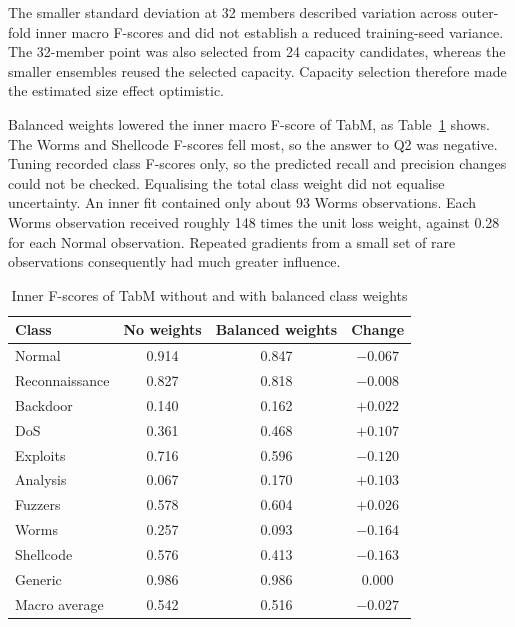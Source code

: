 \documentclass[conference]{IEEEtran}
\begin{document}
The smaller standard deviation at 32 members described variation across outer-fold inner macro F-scores and did not establish a reduced training-seed variance. The 32-member point was also selected from 24 capacity candidates, whereas the smaller ensembles reused the selected capacity. Capacity selection therefore made the estimated size effect optimistic.

Balanced weights lowered the inner macro F-score of TabM, as Table~\ref{tab:classweights} shows. The Worms and Shellcode F-scores fell most, so the answer to Q2 was negative. Tuning recorded class F-scores only, so the predicted recall and precision changes could not be checked. Equalising the total class weight did not equalise uncertainty. An inner fit contained only about 93 Worms observations. Each Worms observation received roughly 148 times the unit loss weight, against 0.28 for each Normal observation. Repeated gradients from a small set of rare observations consequently had much greater influence.

\begin{table}[!t]
    \caption{Inner F-scores of TabM without and with balanced class weights}
    \label{tab:classweights}
    \centering\footnotesize
    \begin{tabular}{@{}lccc@{}}
        \toprule
        Class          & No weights & Balanced weights & Change     \\
        \midrule
        Normal         & 0.914      & 0.847            & $-0.067$   \\
        Reconnaissance & 0.827      & 0.818            & $-0.008$   \\
        Backdoor       & 0.140      & 0.162            & $+0.022$   \\
        DoS            & 0.361      & 0.468            & $+0.107$   \\
        Exploits       & 0.716      & 0.596            & $-0.120$   \\
        Analysis       & 0.067      & 0.170            & $+0.103$   \\
        Fuzzers        & 0.578      & 0.604            & $+0.026$   \\
        Worms          & 0.257      & 0.093            & $-0.164$   \\
        Shellcode      & 0.576      & 0.413            & $-0.163$   \\
        Generic        & 0.986      & 0.986            & $0.000$    \\
        \midrule
        Macro average  & 0.542      & 0.516            & $-0.027$   \\
        \bottomrule
    \end{tabular}
\end{table}
\end{document}
